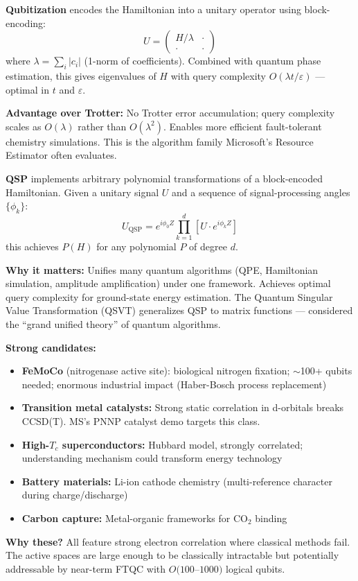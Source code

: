 \documentclass[11pt,a4paper]{article}
\begin{document}
\begin{answerbox}[A56. Qubitization]
\textbf{Qubitization} encodes the Hamiltonian into a unitary operator using block-encoding:
\[
U = \begin{pmatrix} H/\lambda & \cdot \\ \cdot & \cdot \end{pmatrix}
\]
where $\lambda = \sum_i |c_i|$ (1-norm of coefficients). Combined with quantum phase estimation, this gives eigenvalues of $H$ with query complexity $O(\lambda t / \varepsilon)$ --- optimal in $t$ and $\varepsilon$.

\textbf{Advantage over Trotter:} No Trotter error accumulation; query complexity scales as $O(\lambda)$ rather than $O(\lambda^2)$. Enables more efficient fault-tolerant chemistry simulations. This is the algorithm family Microsoft's Resource Estimator often evaluates.
\end{answerbox}

\begin{answerbox}
\textbf{QSP} implements arbitrary polynomial transformations of a block-encoded Hamiltonian. Given a unitary signal $U$ and a sequence of signal-processing angles $\{\phi_k\}$:
\[
U_{\text{QSP}} = e^{i\phi_0 Z} \prod_{k=1}^{d} \left[ U \cdot e^{i\phi_k Z} \right]
\]
this achieves $P(H)$ for any polynomial $P$ of degree $d$.

\textbf{Why it matters:} Unifies many quantum algorithms (QPE, Hamiltonian simulation, amplitude amplification) under one framework. Achieves optimal query complexity for ground-state energy estimation. The Quantum Singular Value Transformation (QSVT) generalizes QSP to matrix functions --- considered the ``grand unified theory'' of quantum algorithms.
\end{answerbox}

\begin{answerbox}
\textbf{Strong candidates:}
\begin{itemize}
    \item \textbf{FeMoCo} (nitrogenase active site): biological nitrogen fixation; $\sim$100+ qubits needed; enormous industrial impact (Haber-Bosch process replacement)
    \item \textbf{Transition metal catalysts:} Strong static correlation in d-orbitals breaks CCSD(T). MS's PNNP catalyst demo targets this class.
    \item \textbf{High-$T_c$ superconductors:} Hubbard model, strongly correlated; understanding mechanism could transform energy technology
    \item \textbf{Battery materials:} Li-ion cathode chemistry (multi-reference character during charge/discharge)
    \item \textbf{Carbon capture:} Metal-organic frameworks for CO$_2$ binding
\end{itemize}
\textbf{Why these?} All feature strong electron correlation where classical methods fail. The active spaces are large enough to be classically intractable but potentially addressable by near-term FTQC with $O(100$--$1000)$ logical qubits.
\end{answerbox}
\end{document}
